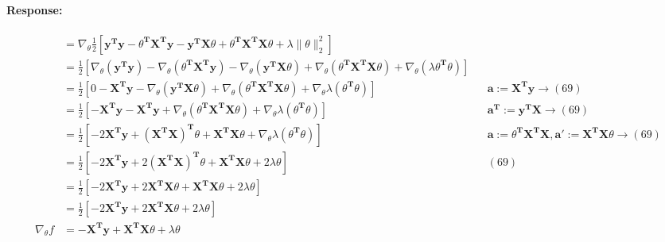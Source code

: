 \documentclass [11pt] {article}
\newcommand{\T}{\bf{T}}
\newcommand{\X}{\bf{X}}
\newcommand{\y}{\bf{y}}
\newenvironment{response}{\begin{responseframe}\vspace{-10pt}\paragraph{Response:}}{\end{responseframe}}
\renewcommand{\bf}[1]{\textbf{{#1}}}
\begin{document}
\begin{enumerate}
\begin{adjustwidth}{-8.4em}{-6em}
\begin{response}
\begin{align*}
                &= \nabla_{\theta} 
                \frac{1}{2} 
                \left[
                    \y^{\T} \y 
                    - \theta^{\T} \X^{\T} \y
                    - \y^{\T} \X \theta 
                    + \theta^{\T} \X^{\T} \X \theta
                    + \lambda \|\theta\|^2_2 
                \right] \\
                &= \frac{1}{2} 
                \left[
                    \nabla_{\theta} \left( \y^{\T} \y \right)
                    - \nabla_{\theta} \left( \theta^{\T} \X^{\T} \y \right)
                    - \nabla_{\theta} \left( \y^{\T} \X \theta  \right)
                    + \nabla_{\theta} \left( \theta^{\T} \X^{\T} \X \theta \right)
                    + \nabla_{\theta} \left( \lambda \theta^{\T} \theta \right)
                \right] \\
                &= \frac{1}{2} 
                \left[ 
                    0 
                    - \X^{\T} \y
                    - \nabla_{\theta} \left( \y^{\T} \X \theta \right)
                    + \nabla_{\theta} \left( \theta^{\T} \X^{\T} \X \theta \right)
                    + \nabla_{\theta} \lambda \left( \theta^{\T} \theta \right)
                \right]
                && \bf{a} := \X^{\T} \y \to (69) \\
                &= \frac{1}{2} 
                \left[ 
                    - \X^{\T} \y
                    - \X^{\T} \y
                    + \nabla_{\theta} \left( \theta^{\T} \X^{\T} \X \theta \right)
                    + \nabla_{\theta} \lambda \left( \theta^{\T} \theta \right)
                \right]
                && \bf{a}^{\T} := \y^{\T} \X \to (69) \\
                &= \frac{1}{2} 
                \left[ 
                    - 2 \X^{\T} \y
                    + \left( \X^{\T} \X \right)^{\T} \theta + \X^{\T} \X \theta
                    + \nabla_{\theta} \lambda \left( \theta^{\T} \theta \right)
                \right]
                && \bf{a} := \theta^{\T} \X^{\T} \X, \bf{a}' := \X^{\T} \X \theta \to (69) \\
                &= \frac{1}{2} 
                \left[ 
                    - 2 \X^{\T} \y
                    + 2 \left( \X^{\T} \X \right)^{\T} \theta + \X^{\T} \X \theta
                    + 2 \lambda \theta
                \right]
                && (69) \\
                &= \frac{1}{2} 
                \left[ 
                    - 2 \X^{\T} \y
                    + 2 \X^{\T} \X \theta + \X^{\T} \X \theta
                    + 2 \lambda \theta
                \right] \\
                &= \frac{1}{2} 
                \left[ 
                    - 2 \X^{\T} \y
                    + 2 \X^{\T} \X \theta
                    + 2 \lambda \theta
                \right] \\
                \nabla_{\theta} f
                &= 
                - \X^{\T} \y
                + \X^{\T} \X \theta
                + \lambda \theta
                \end{align*}


\end{response}
\end{adjustwidth}
\end{enumerate}
\end{document}
